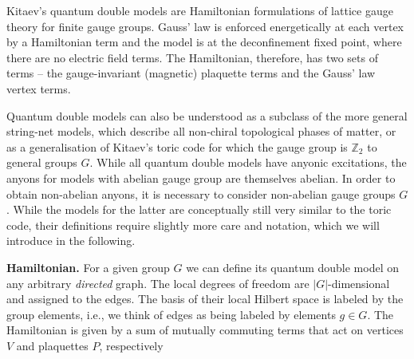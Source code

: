 \documentclass[two column]{article}
\begin{document}
Kitaev's quantum double models are Hamiltonian formulations of lattice gauge theory for finite gauge groups. Gauss' law is enforced energetically at each vertex by a Hamiltonian term and the model is at the deconfinement fixed point, where there are no electric field terms.
The Hamiltonian, therefore, has two sets of terms -- the gauge-invariant (magnetic) plaquette terms and the Gauss' law vertex terms\cite{cui2018topological, Kitaev_2003}. 

Quantum double models can also be understood as a subclass of the more general string-net models\cite{Levin_2005}, which describe all non-chiral topological phases of matter, or as a generalisation of Kitaev's toric code\cite{Kitaev_2003} for which the gauge group is $\mathbb Z_2$ to general groups $G$. While all quantum double models have anyonic excitations, the anyons for models with abelian gauge group are themselves abelian. In order to obtain non-abelian anyons, it is necessary to consider non-abelian gauge groups $G$. While the models for the latter are conceptually still very similar to the toric code, their definitions require slightly more care and notation, which we will introduce in the following. 

\textbf{Hamiltonian.}
For a given group $G$ we can define its quantum double model on any arbitrary \emph{directed} graph. The local degrees of freedom are $|G|$-dimensional and assigned to the edges. The basis of their local Hilbert space is labeled by the group elements, i.e., we think of edges as being labeled by elements $g\in G$. The Hamiltonian is given by a sum of mutually commuting terms that act on vertices $V$ and plaquettes $P$, respectively


\end{document}
